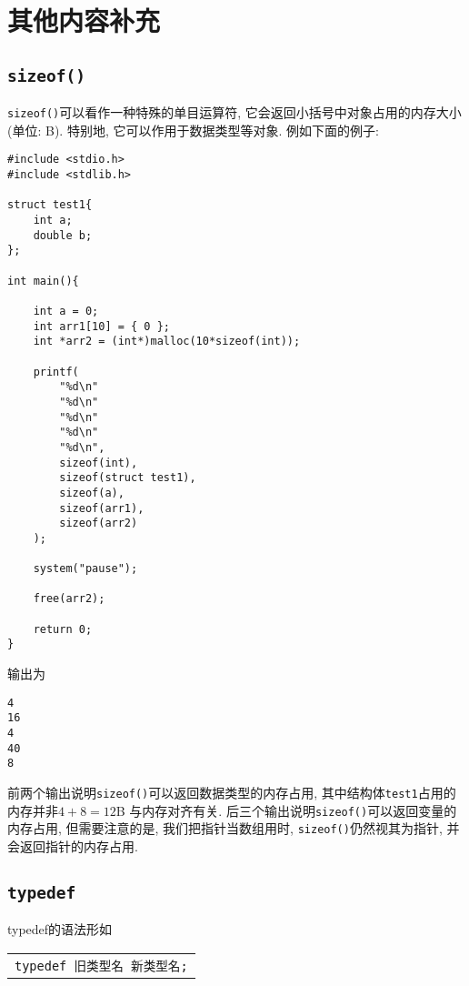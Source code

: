\chapter{其他内容补充} \label{其他内容补充}
    \section{\texttt{sizeof()}}
        \texttt{sizeof()}可以看作一种特殊的单目运算符, 它会返回小括号中对象占用的内存大小(单位: B). 特别地, 它可以作用于数据类型等对象. 例如下面的例子:
\begin{lstlisting}
#include <stdio.h>
#include <stdlib.h>

struct test1{
    int a;
    double b;
};

int main(){

    int a = 0;
    int arr1[10] = { 0 };
    int *arr2 = (int*)malloc(10*sizeof(int));

    printf(
        "%d\n"
        "%d\n"
        "%d\n"
        "%d\n"
        "%d\n",
        sizeof(int),
        sizeof(struct test1),
        sizeof(a),
        sizeof(arr1),
        sizeof(arr2)
    );

    system("pause");

    free(arr2);

    return 0;
}
\end{lstlisting}

        输出为
\begin{lstlisting}
4
16
4
40
8
\end{lstlisting}

        前两个输出说明\texttt{sizeof()}可以返回数据类型的内存占用, 其中结构体\texttt{test1}占用的内存并非$4 + 8 = 12$B 与内存对齐有关. 后三个输出说明\texttt{sizeof()}可以返回变量的内存占用, 但需要注意的是, 我们把指针当数组用时, \texttt{sizeof()}仍然视其为指针, 并会返回指针的内存占用.

    \section{\texttt{typedef}}
        typedef的语法形如
        \begin{center}
        \begin{longtable}{l}
            \texttt{typedef 旧类型名~新类型名;}
        \end{longtable}
        \end{center}
        
